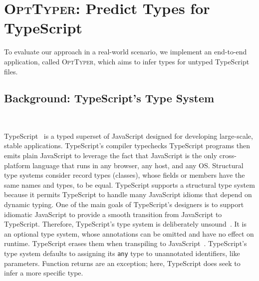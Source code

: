 \documentclass[acmsmall, review, anonymous]{acmart}\settopmatter{printfolios=true,printccs=false,printacmref=false}
\newcommand{\projectname}{\textsc{OptTyper}\xspace}
\begin{document}

\section{\projectname: Predict Types for TypeScript}
\label{sec:prodts}
To evaluate our approach in a real-world scenario, we
implement an end-to-end application, called \projectname, which aims
to infer types for untyped TypeScript files.

\subsection{Background: TypeScript's Type System}~\label{ssec:intro-typescript}

TypeScript~\citep{typescript} is a typed superset of
JavaScript designed for developing large-scale, stable applications.
TypeScript's compiler typechecks TypeScript programs then emits plain JavaScript
to leverage the fact that JavaScript is the only cross-platform
language that runs in any browser, any host, and any OS.
Structural type systems consider record types (classes), whose fields or members have the same names and types, to be equal.
TypeScript supports a
structural type system because it permits TypeScript to handle many JavaScript idioms that depend on dynamic typing.
One of the main goals of TypeScript's designers is to support idiomatic
JavaScript to
provide a smooth transition from JavaScript to TypeScript.
%
Therefore, TypeScript's type system is deliberately
unsound~\citep{understandtypescript}.  It is an optional type system, whose
annotations can be omitted and have no effect on runtime.  TypeScript erases 
them when transpiling to JavaScript~\citep{understandtypescript}.
TypeScript's type system defaults to assigning its \texttt{any} type to
unannotated identifiers, like parameters.  Function returns are an exception;
here, TypeScript does seek to infer a more specific type.

\end{document}
